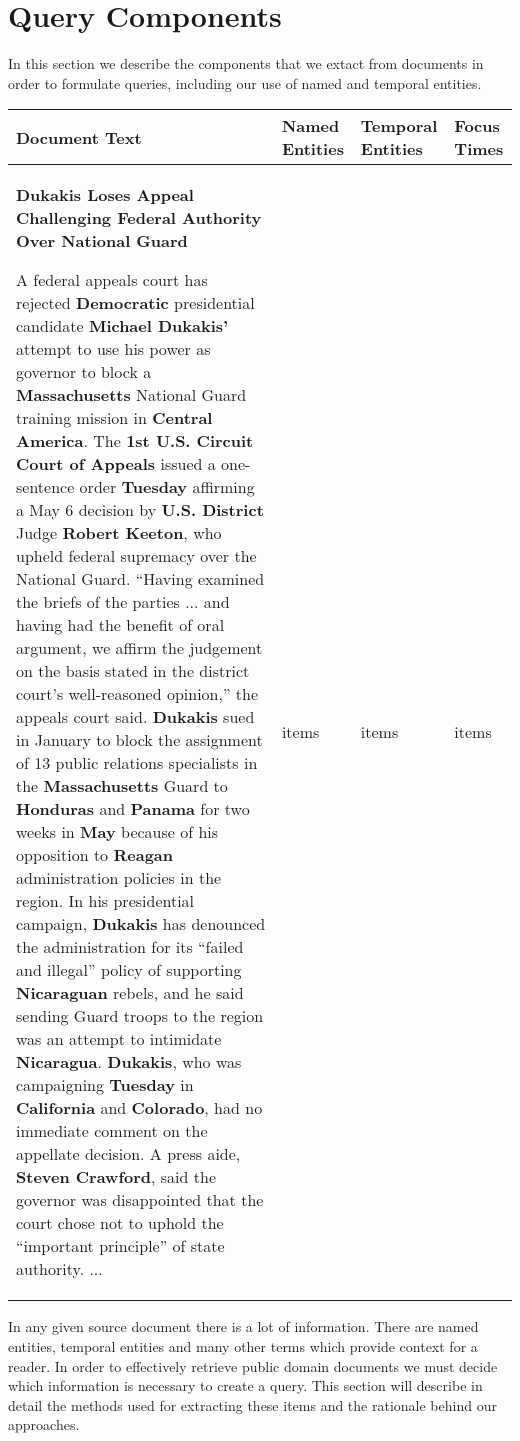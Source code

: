\documentclass{mpaper}
\begin{document}
\section{Query Components}
In this section we describe the components that we extact from documents in order to formulate queries, including our use of named and temporal entities.
\begin{table*}[t]
\centering
\begin{tabular}{|p{8cm}|p{2cm}|p{2cm}|p{2cm}|}
\hline
Document Text & Named Entities  & Temporal Entities & Focus Times  \\ \hline
\textbf{Dukakis Loses Appeal Challenging Federal Authority Over National
Guard}

   A federal appeals court has rejected \textbf{Democratic} presidential candidate \textbf{Michael Dukakis'} attempt to use his power as governor to block a \textbf{Massachusetts} National Guard training mission in \textbf{Central America}.
   The \textbf{1st U.S. Circuit Court of Appeals} issued a one-sentence order \textbf{Tuesday} affirming a May 6 decision by \textbf{U.S. District} Judge \textbf{Robert Keeton}, who upheld federal supremacy over the National Guard.
   ``Having examined the briefs of the parties ... and having had the benefit of oral argument, we affirm the judgement on the basis stated in the district court's well-reasoned opinion,'' the appeals court said.
   \textbf{Dukakis} sued in January to block the assignment of 13 public relations specialists in the \textbf{Massachusetts} Guard to \textbf{Honduras} and \textbf{Panama} for two weeks in \textbf{May} because of his opposition to \textbf{Reagan} administration policies in the region.
   In his presidential campaign, \textbf{Dukakis} has denounced the administration for its ``failed and illegal'' policy of supporting \textbf{Nicaraguan} rebels, and he said sending Guard troops to the region was an attempt to intimidate \textbf{Nicaragua}.
   \textbf{Dukakis}, who was campaigning \textbf{Tuesday} in \textbf{California} and \textbf{Colorado}, had no immediate comment on the appellate decision. A press aide, \textbf{Steven Crawford}, said the governor was disappointed that the court chose not to uphold the ``important principle'' of state authority. ...
& items
& items
& items
\\ \hline
\end{tabular}
\end{table*}
In any given source document there is a lot of information. There are named entities, temporal entities and many other terms which provide context for a reader.
In order to effectively retrieve public domain documents we must decide which information is necessary to create a query. 
This section will describe in detail the methods used for extracting these items and the rationale behind our approaches.
\end{document}
